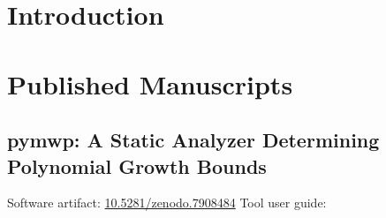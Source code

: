 \dedication{}

\begin{abstract}

\end{abstract}

\mainmatter

\chapter{Introduction}\label{introduction}


\chapter{Published Manuscripts}\label{published-manuscripts}

\clearpage
\section{pymwp: A Static Analyzer Determining Polynomial Growth Bounds}\label{sec:atva}
{\noindent Software artifact:
\href{https://doi.org/10.5281/zenodo.7908484}{10.5281/zenodo.7908484}
\newline\noindent Tool user guide: }



